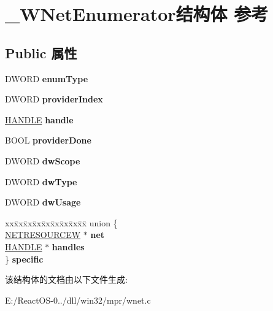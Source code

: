 \hypertarget{struct___w_net_enumerator}{}\section{\+\_\+\+W\+Net\+Enumerator结构体 参考}
\label{struct___w_net_enumerator}
\subsection*{Public 属性}
\begin{DoxyCompactItemize}
\item 
\mbox{\label{struct___w_net_enumerator_ad7bdaf3409d93eca10e6119de77ad2f0}} 
D\+W\+O\+RD {\bfseries enum\+Type}
\item 
\mbox{\label{struct___w_net_enumerator_a624d850fb7847cd21a09779c9b9f152a}} 
D\+W\+O\+RD {\bfseries provider\+Index}
\item 
\mbox{\label{struct___w_net_enumerator_aed71367c7bcdb982b09e7ef7cdedb7d0}} 
\hyperlink{interfacevoid}{H\+A\+N\+D\+LE} {\bfseries handle}
\item 
\mbox{\label{struct___w_net_enumerator_aa20b98d814826e74571ce9b913e6f7ef}} 
B\+O\+OL {\bfseries provider\+Done}
\item 
\mbox{\label{struct___w_net_enumerator_a97f2fa4ca998b4dc4500189426a77b44}} 
D\+W\+O\+RD {\bfseries dw\+Scope}
\item 
\mbox{\label{struct___w_net_enumerator_a723f2f64a9aa84cb3bbf8544dd2e557a}} 
D\+W\+O\+RD {\bfseries dw\+Type}
\item 
\mbox{\label{struct___w_net_enumerator_a2d04a3151d6cb6d51f4fd9bdf29fd8fa}} 
D\+W\+O\+RD {\bfseries dw\+Usage}
\item 
\mbox{\label{struct___w_net_enumerator_a951ebb2da95d33e75f378029a54ee26b}} 
\begin{tabbing}
xx\=xx\=xx\=xx\=xx\=xx\=xx\=xx\=xx\=\kill
union \{\\
\>\hyperlink{struct___n_e_t_r_e_s_o_u_r_c_e_w}{NETRESOURCEW} $\ast$ {\bfseries net}\\
\>\hyperlink{interfacevoid}{HANDLE} $\ast$ {\bfseries handles}\\
\} {\bfseries specific}\\

\end{tabbing}\end{DoxyCompactItemize}


该结构体的文档由以下文件生成\+:\begin{DoxyCompactItemize}
\item 
E\+:/\+React\+O\+S-\/0../dll/win32/mpr/wnet.\+c\end{DoxyCompactItemize}

